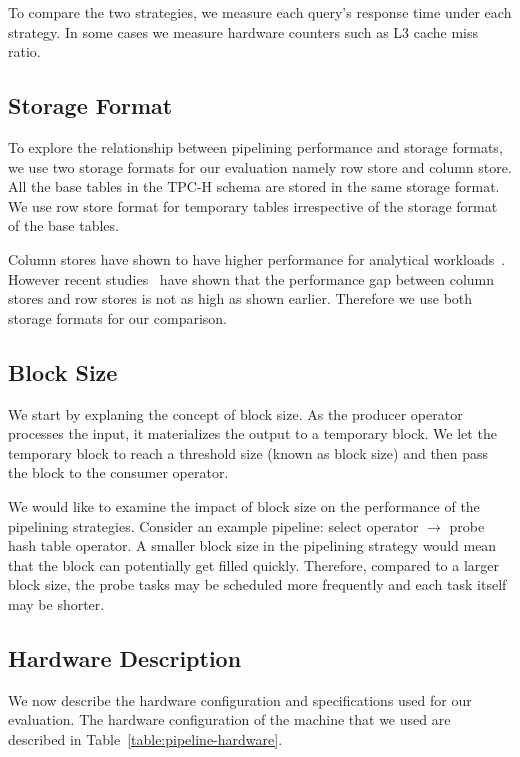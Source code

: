 To compare the two strategies, we measure each query's response time under each strategy.
In some cases we measure hardware counters such as L3 cache miss ratio.

\subsection{Storage Format}
To explore the relationship between pipelining performance and storage formats, we use two storage formats for our evaluation namely row store and column store.
All the base tables in the TPC-H schema are stored in the same storage format.
We use row store format for temporary tables irrespective of the storage format of the base tables.

Column stores have shown to have higher performance for analytical workloads~\cite{AbadiMH08}. 
However recent studies~\cite{quickstep-vldb} have shown that the performance gap between column stores and row stores is not as high as shown earlier.
Therefore we use both storage formats for our comparison. 

\subsection{Block Size}
We start by explaning the concept of block size.
As the producer operator processes the input, it materializes the output to a temporary block. 
We let the temporary block to reach a threshold size (known as block size) and then pass the block to the consumer operator. 

We would like to examine the impact of block size on the performance of the pipelining strategies. 
Consider an example pipeline: select operator $\rightarrow$ probe hash table operator.
A smaller block size in the pipelining strategy would mean that the block can potentially get filled quickly. 
Therefore, compared to a larger block size, the probe tasks may be scheduled more frequently and each task itself may be shorter. 

\subsection{Hardware Description}
We now describe the hardware configuration and \sys{} specifications used for our evaluation. 
The hardware configuration of the machine that we used are described in Table~\ref{table:pipeline-hardware}.

